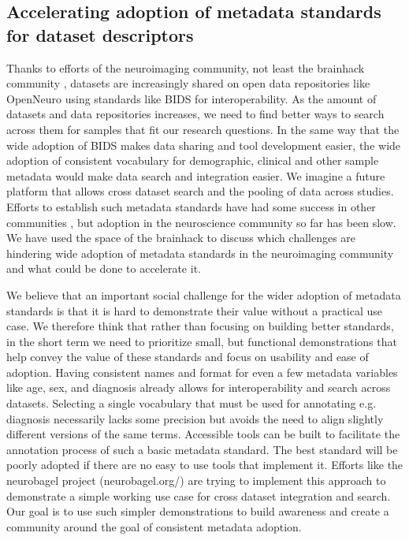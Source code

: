 \documentclass[../main.tex]{subfiles}
\begin{document}
\subsection{Accelerating adoption of metadata standards for dataset descriptors}

%

Thanks to efforts of the neuroimaging community, not least the brainhack community \parencite{Gau2021}, datasets are increasingly shared on open data repositories like OpenNeuro \parencite{Markiewicz2021-bf} using standards like BIDS \parencite{Gorgolewski2016} for interoperability. As the amount of datasets and data repositories increases, we need to find better ways to search across them for samples that fit our research questions. In the same way that the wide adoption of BIDS makes data sharing and tool development easier, the wide adoption of consistent vocabulary for demographic, clinical and other sample metadata would make data search and integration easier. We imagine a future platform that allows cross dataset search and the pooling of data across studies. Efforts to establish such metadata standards have had some success in other communities \parencite{Field2008-kw, Stang2010-nl}, but adoption in the neuroscience community so far has been slow. We have used the space of the brainhack to discuss which challenges are hindering wide adoption of metadata standards in the neuroimaging community and what could be done to accelerate it.

We believe that an important social challenge for the wider adoption of metadata standards is that it is hard to demonstrate their value without a practical use case. We therefore think that rather than focusing on building better standards, in the short term we need to prioritize small, but functional demonstrations that help convey the value of these standards and focus on usability and ease of adoption. Having consistent names and format for even a few metadata variables like age, sex, and diagnosis already allows for interoperability and search across datasets. Selecting a single vocabulary that must be used for annotating e.g. diagnosis necessarily lacks some precision but avoids the need to align slightly different versions of the same terms. Accessible tools can be built to facilitate the annotation process of such a basic metadata standard. The best standard will be poorly adopted if there are no easy to use tools that implement it. Efforts like the neurobagel project (neurobagel.org/) are trying to implement this approach to demonstrate a simple working use case for cross dataset integration and search. Our goal is to use such simpler demonstrations to build awareness and create a community around the goal of consistent metadata adoption.
\end{document}
